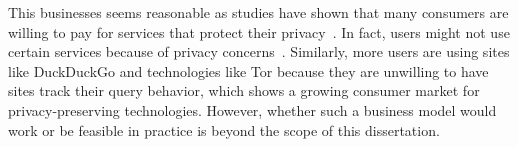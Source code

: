 This businesses seems reasonable as studies have shown that 
many consumers are willing to pay for services that protect their privacy~\cite{atlantic,atlantic2}. 
In fact, users might not use certain services because of privacy concerns~\cite{ravichandran2009capturing,riley2008tolls}.
Similarly, more users are using sites like DuckDuckGo and technologies like Tor 
because they are unwilling to have sites track their
query behavior, which shows a growing consumer market for privacy-preserving technologies. 
However, whether such a business model would work or be feasible 
in practice is beyond the scope of this dissertation.



%


